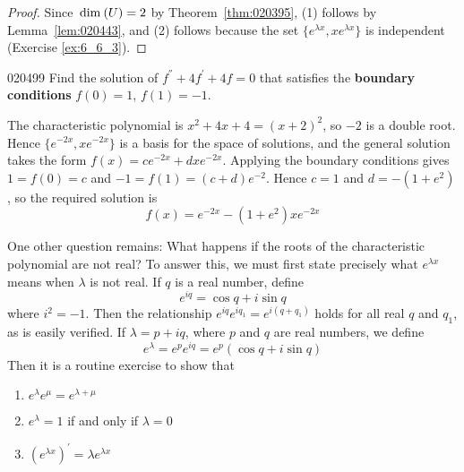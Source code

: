 \begin{proof}
Since $\thinspace\operatorname{dim\medspace}(U) = 2$ by Theorem~\ref{thm:020395}, (1) follows by Lemma~\ref{lem:020443}, and (2) follows because the set $\{e^{\lambda x}, xe^{\lambda x}\}$ is independent (Exercise \ref{ex:6_6_3}).
\end{proof}

\begin{example}{}{020499}
Find the solution of $f^\dprime + 4f^\prime + 4f = 0$ that satisfies the \textbf{boundary conditions} $f(0) = 1$, $f(1) = -1$.

\begin{solution}
The characteristic polynomial is $x^{2} + 4x + 4 = (x + 2)^{2}$, so $-2$ is a double root. Hence $\{e^{-2x}, xe^{-2x}\}$ is a basis for the space of solutions, and the general solution takes the form $f(x) = ce^{-2x} + dxe^{-2x}$. Applying the boundary conditions gives $1 = f(0) = c$ and $-1 = f(1) = (c + d)e^{-2}$. Hence $c = 1$ and $d = -(1 + e^{2})$, so the required solution is
\begin{equation*}
f(x) = e^{-2x} - (1 + e^2)xe^{-2x}
\end{equation*}
\end{solution}
\end{example}

One other question remains: What happens if the roots of the characteristic polynomial are not real? To answer this, we must first state precisely what $e^{\lambda x}$ means when $\lambda$ is not real. If $q$ is a real number, define
\begin{equation*}
e^{iq} = \cos q + i \sin q
\end{equation*}
where $i^{2} = -1$. Then the relationship $e^{iq}e^{iq_1} = e^{i(q + q_1)}$ holds for all real $q$ and $q_{1}$, as is easily verified. If $\lambda = p + iq$, where $p$ and $q$ are real numbers, we define
\begin{equation*}
e^\lambda = e ^p e^{iq} = e^p (\cos q + i \sin q)
\end{equation*}
Then it is a routine exercise to show that

\begin{enumerate}
\item $e^{\lambda} e^{\mu} = e^{\lambda + \mu}$

\item $e^{\lambda} = 1$ if and only if $\lambda = 0$

\item $(e^{\lambda x})^\prime = \lambda e^{\lambda x}$

\end{enumerate}

